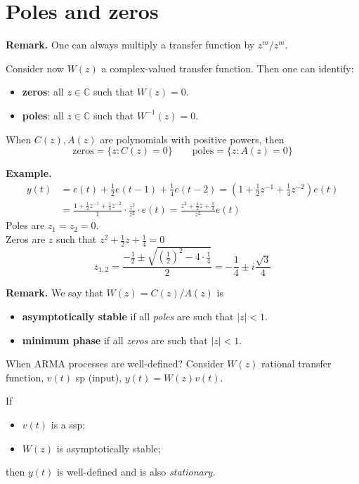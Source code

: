 \section{Poles and zeros}

\textbf{Remark.}
One can always multiply a transfer function by $z^{m}/z^{m}$.

Consider now $W(z)$ a complex-valued transfer function. Then one can identify:
\begin{itemize}
	\item \textbf{zeros}: all $z\in \mathbb{C}$ such that $W(z)=0$.
	\item \textbf{poles}: all $z\in \mathbb{C}$ such that $W^{-1} (z)=0$.
\end{itemize}
When $C(z),A(z)$ are polynomials with positive powers, then
\[
	\text{zeros}=\{z:C(z)=0\} \qquad \text{poles}=\{z:A(z)=0\}
\]

\textbf{Example.}
\begin{align*}
y(t) &=e(t)+\frac{1}{2} e(t-1)+\frac{1}{4} e(t-2) =\left(1+\frac{1}{2} z^{-1}+\frac{1}{4} z^{-2}\right) e(t) \\
&=\frac{1+\frac{1}{2} z^{-1}+\frac{1}{4} z^{-2}}{1} \cdot \frac{z^{2}}{z^{2}}\cdot e(t) =\frac{z^{2}+\frac{1}{2} z+\frac{1}{4}}{z^{2}} e(t)
\end{align*}
Poles are $z_{1}=z_{2}=0$.\\
Zeros are $z$ such that $z^{2}+\frac{1}{2} z+\frac{1}{4}=0$
\[
	z_{1,2}=\frac{-\frac{1}{2} \pm \sqrt{\left( \frac{1}{2}  \right) ^2 -4\cdot\frac{1}{4} } }{2} = -\frac{1}{4}\pm i\frac{\sqrt{3} }{4}
\]

\textbf{Remark.}
We say that $W(z)=C(z)/A(z)$ is
\begin{itemize}
	\item \textbf{asymptotically stable} if all \emph{poles} are such that $|z|<1$.
	\item \textbf{minimum phase} if all \emph{zeros} are such that $|z|<1$.
\end{itemize}

When ARMA processes are well-defined? Consider $W(z)$ rational transfer function, $v(t)$ \gls{sp} (input), $y(t)=W(z)v(t)$.

\begin{theorem}
	If
	\begin{itemize}
		\item $v(t)$ is a \gls{ssp};
		\item $W(z)$ is asymptotically stable;
	\end{itemize}
	then $y(t)$ is well-defined and is also \emph{stationary}.
\end{theorem}


